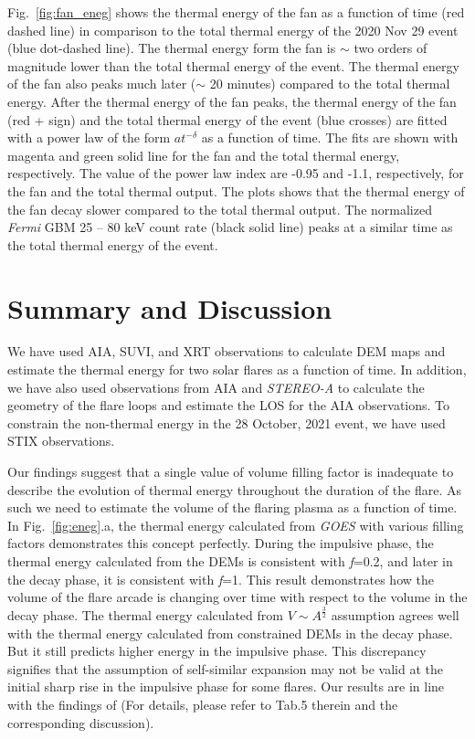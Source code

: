 Fig.~\ref{fig:fan_eneg} shows the thermal energy of the fan as a function of time (red dashed line) in comparison to the total thermal energy of the 2020 Nov 29 event (blue dot-dashed line). The thermal energy form the fan is $\sim$ two orders of magnitude lower than the total thermal energy of the event. The thermal energy of the fan also peaks much later ($\sim$ 20 minutes) compared to the total thermal energy. After the thermal energy of the fan peaks, the thermal energy of the fan (red + sign) and the total thermal energy of the event (blue crosses) are fitted with a power law of the form $at^{-\delta}$ as a function of time. The fits are shown with magenta and green solid line for the fan and the total thermal energy, respectively. The value of the power law index are -0.95 and -1.1, respectively, for the fan and the total thermal output. The plots shows that the thermal energy of the fan decay slower compared to the total thermal output. The normalized {\it Fermi} GBM 25 {--} 80 keV count rate (black solid line) peaks at a similar time as the total thermal energy of the event. 

\section{Summary and Discussion}\label{sec:dis}

We have used AIA, SUVI, and XRT observations to calculate DEM maps and estimate the thermal energy for two solar flares as a function of time. In addition, we have also used observations from AIA and {\it STEREO-A} to calculate the geometry of the flare loops and estimate the LOS for the AIA observations. To constrain the non-thermal energy in the 28 October, 2021 event, we have used STIX observations.  
 
Our findings suggest that a single value of volume filling factor is inadequate to describe the evolution of thermal energy throughout the duration of the flare. As such we need to estimate the volume of the flaring plasma as a function of time. In Fig.~\ref{fig:eneg}.a, the thermal energy calculated from {\it GOES} with various filling factors demonstrates this concept perfectly. During the impulsive phase, the thermal energy calculated from the DEMs is consistent with \textit{f}=0.2, and later in the decay phase, it is consistent with \textit{f}=1. This result demonstrates how the volume of the flare arcade is changing over time with respect to the volume in the decay phase. The thermal energy calculated from $V\sim A^{\frac{3}{2}}$ assumption agrees well with the thermal energy calculated from constrained DEMs in the decay phase. But it still predicts higher energy in the impulsive phase. This discrepancy signifies that the assumption of self-similar expansion may not be valid at the initial sharp rise in the impulsive phase for some flares. Our results are in line with the findings of \cite{hilarie05} (For details, please refer to Tab.5 therein and the corresponding discussion).

